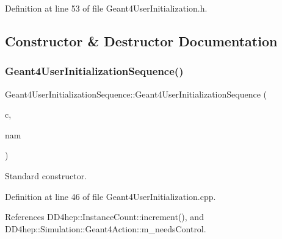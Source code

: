 Definition at line 53 of file Geant4\+User\+Initialization.\+h.



\subsection{Constructor \& Destructor Documentation}
\hypertarget{class_d_d4hep_1_1_simulation_1_1_geant4_user_initialization_sequence_a6e8c9a4df7e03c8f26b25684f982f2cd}{}\label{class_d_d4hep_1_1_simulation_1_1_geant4_user_initialization_sequence_a6e8c9a4df7e03c8f26b25684f982f2cd} 
\subsubsection{\texorpdfstring{Geant4\+User\+Initialization\+Sequence()}{Geant4UserInitializationSequence()}}
{\footnotesize\ttfamily Geant4\+User\+Initialization\+Sequence\+::\+Geant4\+User\+Initialization\+Sequence (\begin{DoxyParamCaption}\item[{\hyperlink{class_d_d4hep_1_1_simulation_1_1_geant4_context}{Geant4\+Context} $\ast$}]{c,  }\item[{const std\+::string \&}]{nam }\end{DoxyParamCaption})}



Standard constructor. 



Definition at line 46 of file Geant4\+User\+Initialization.\+cpp.



References D\+D4hep\+::\+Instance\+Count\+::increment(), and D\+D4hep\+::\+Simulation\+::\+Geant4\+Action\+::m\+\_\+needs\+Control.

\hypertarget{class_d_d4hep_1_1_simulation_1_1_geant4_user_initialization_sequence_aa593a6ec771aea3c621f4da1cb2beaf6}{}\label{class_d_d4hep_1_1_simulation_1_1_geant4_user_initialization_sequence_aa593a6ec771aea3c621f4da1cb2beaf6} 
